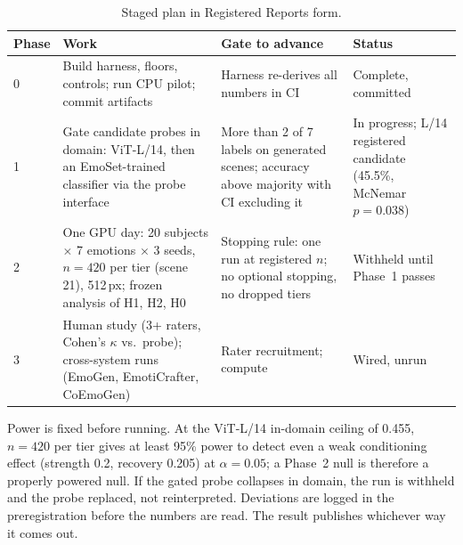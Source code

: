 \documentclass[10pt]{article}
\begin{document}
\begin{table}[t]
\centering\small
\begin{tabular}{p{0.9cm} p{3.9cm} p{3.9cm} p{3.1cm}}
\hline
\textbf{Phase} & \textbf{Work} & \textbf{Gate to advance} & \textbf{Status} \\
\hline
0 & Build harness, floors, controls; run CPU pilot; commit artifacts & Harness re-derives all numbers in CI & Complete, committed \\
1 & Gate candidate probes in domain: ViT-L/14, then an EmoSet-trained classifier via the probe interface & More than 2 of 7 labels on generated scenes; accuracy above majority with CI excluding it & In progress; L/14 registered candidate (45.5\%, McNemar $p=0.038$) \\
2 & One GPU day: 20 subjects $\times$ 7 emotions $\times$ 3 seeds, $n=420$ per tier (scene 21), 512\,px; frozen analysis of H1, H2, H0 & Stopping rule: one run at registered $n$; no optional stopping, no dropped tiers & Withheld until Phase~1 passes \\
3 & Human study (3+ raters, Cohen's $\kappa$ vs.\ probe); cross-system runs (EmoGen, EmotiCrafter, CoEmoGen) & Rater recruitment; compute & Wired, unrun \\
\hline
\end{tabular}
\caption{Staged plan in Registered Reports form.}
\label{tab:timeline}
\end{table}

Power is fixed before running. At the ViT-L/14 in-domain ceiling of 0.455, $n=420$ per tier gives at least 95\% power to detect even a weak conditioning effect (strength 0.2, recovery 0.205) at $\alpha=0.05$; a Phase~2 null is therefore a properly powered null. If the gated probe collapses in domain, the run is withheld and the probe replaced, not reinterpreted. Deviations are logged in the preregistration before the numbers are read. The result publishes whichever way it comes out.
\end{document}
